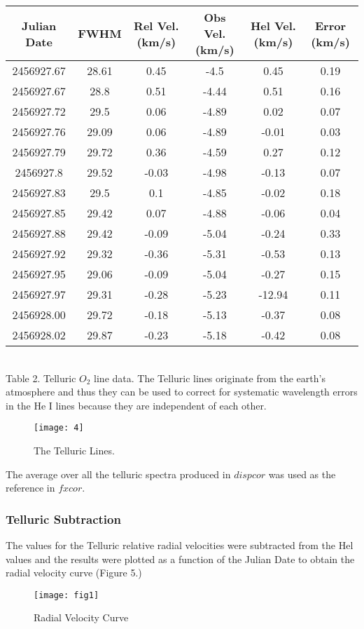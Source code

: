 \documentclass{article}
\begin{document}
\begin{tabular}{|c|c|c|c|c|c|}
\hline
Julian Date & FWHM & Rel Vel. (km/s) & Obs Vel. (km/s) & Hel Vel. (km/s) & Error (km/s)\\
\hline
2456927.67 & 28.61 & 0.45 & -4.5 & 0.45 & 0.19\\
2456927.67 & 28.8 & 0.51 & -4.44 & 0.51 & 0.16\\
2456927.72 & 29.5 & 0.06 & -4.89 & 0.02 & 0.07\\
2456927.76 & 29.09 & 0.06 & -4.89 & -0.01 & 0.03\\
2456927.79 & 29.72 & 0.36 & -4.59 & 0.27 & 0.12\\
2456927.8 & 29.52 & -0.03 & -4.98 & -0.13 & 0.07\\
2456927.83 & 29.5 & 0.1 & -4.85 & -0.02 & 0.18\\
2456927.85 & 29.42 & 0.07 & -4.88 & -0.06 & 0.04\\
2456927.88 & 29.42 & -0.09 & -5.04 & -0.24 & 0.33\\
2456927.92 & 29.32 & -0.36 & -5.31 & -0.53 & 0.13\\
2456927.95 & 29.06 & -0.09 & -5.04 & -0.27 & 0.15\\
2456927.97 & 29.31 & -0.28 & -5.23 & -12.94 & 0.11\\
2456928.00 & 29.72 & -0.18 & -5.13 & -0.37 & 0.08\\
2456928.02 & 29.87 & -0.23 & -5.18 & -0.42 & 0.08\\


\hline
\end{tabular}\\

Table 2. Telluric $O_2$ line data. The Telluric lines originate from the earth's atmosphere and thus they can be used to correct for systematic wavelength errors in the He I lines because they are independent of each other.
\begin{figure}
\texttt{[image: 4]} %
\caption{The Telluric Lines.}
\end{figure}
The average over all the telluric spectra produced in $dispcor$ was used as the reference in $fxcor.$
\subsubsection{Telluric Subtraction}
The values for the Telluric relative radial velocities were subtracted from the Hel values and the results were plotted as a function of the Julian Date to obtain the radial velocity curve (Figure 5.)
\begin{figure}
\texttt{[image: fig1]} %
\caption{Radial Velocity Curve}
\end{figure}
\end{document}
